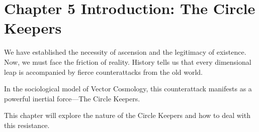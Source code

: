 \section*{Chapter 5 Introduction: The Circle Keepers}

We have established the necessity of ascension and the legitimacy of existence. Now, we must face the friction of reality. History tells us that every dimensional leap is accompanied by fierce counterattacks from the old world.

In the sociological model of Vector Cosmology, this counterattack manifests as a powerful inertial force---The Circle Keepers.

This chapter will explore the nature of the Circle Keepers and how to deal with this resistance.

